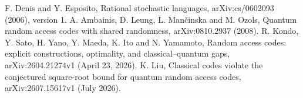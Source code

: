  F. Denis and Y. Esposito,
Rational stochastic languages, arXiv:cs/0602093 (2006), version 1.
 A. Ambainis, D. Leung, L. Man\v cinska and M. Ozols,
Quantum random access codes with shared randomness,
arXiv:0810.2937 (2008).
 R. Kondo, Y. Sato, H. Yano, Y. Maeda, K. Ito and
N. Yamamoto, Random access codes: explicit constructions, optimality,
and classical--quantum gaps, arXiv:2604.21274v1 (April 23, 2026).
 K. Liu, Classical codes violate the conjectured
square-root bound for quantum random access codes,
arXiv:2607.15617v1 (July 2026).
